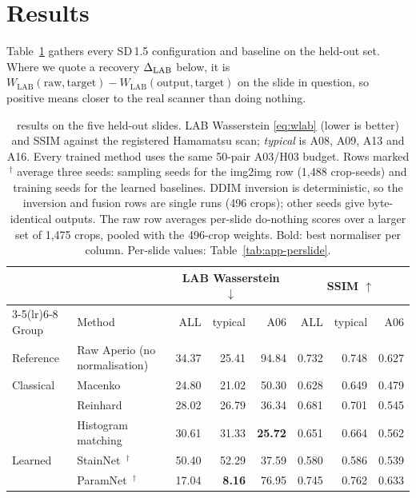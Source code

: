 \section{Results}
\label{sec:results}

Table~\ref{tab:main} gathers every SD\,1.5 \AtoH{} configuration and baseline on the held-out set. Where we quote a recovery
$\Delta_{\mathrm{LAB}}$ below, it is $W_{\mathrm{LAB}}(\text{raw},\text{target})-W_{\mathrm{LAB}}(\text{output},\text{target})$
on the slide in question, so positive means closer to the real scanner than doing nothing.

\begin{table}[t]
\centering
\caption{\AtoH{} results on the five held-out slides. LAB Wasserstein \eqref{eq:wlab} (lower is
better) and SSIM against the registered Hamamatsu scan; \emph{typical} is A08, A09, A13 and A16. Every
trained method uses the same 50-pair A03/H03 budget. Rows marked $^\dagger$ average three seeds: sampling seeds for the img2img
row (1{,}488 crop-seeds) and training seeds for the learned baselines. DDIM inversion is deterministic, so
the inversion and fusion rows are single runs (496 crops); other seeds give byte-identical outputs. The raw row averages per-slide do-nothing scores over a larger set of 1{,}475 crops, pooled with the 496-crop weights.
Bold: best normaliser per column. Per-slide values: Table~\ref{tab:app-perslide}.}
\label{tab:main}
\small
\begin{tabular}{llrrrrrr}
\toprule
& & \multicolumn{3}{c}{LAB Wasserstein $\downarrow$} & \multicolumn{3}{c}{SSIM $\uparrow$}\\
\cmidrule(lr){3-5}\cmidrule(lr){6-8}
Group & Method & ALL & typical & A06 & ALL & typical & A06\\
\midrule
Reference & Raw Aperio (no normalisation) & 34.37 & 25.41 & 94.84 & 0.732 & 0.748 & 0.627\\
\midrule
Classical & Macenko~\cite{macenko2009normalisation} & 24.80 & 21.02 & 50.30 & 0.628 & 0.649 & 0.479\\
 & Reinhard~\cite{reinhard2001colortransfer} & 28.02 & 26.79 & 36.34 & 0.681 & 0.701 & 0.545\\
 & Histogram matching & 30.61 & 31.33 & \textbf{25.72} & 0.651 & 0.664 & 0.562\\
\midrule
Learned & StainNet~\cite{kang2021stainnet}$^\dagger$ & 50.40 & 52.29 & 37.59 & 0.580 & 0.586 & 0.539\\
 & ParamNet~\cite{kang2024paramnet}$^\dagger$ & 17.04 & \textbf{8.16} & 76.95 & 0.745 & 0.762 & 0.633\\

\end{tabular}
\end{table}
